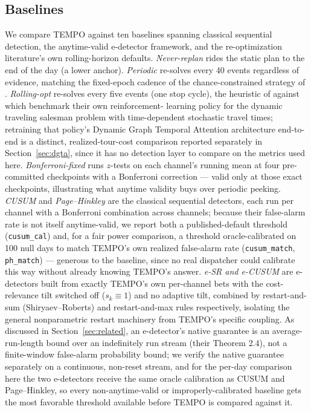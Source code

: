 \documentclass[trsc,dblanonrev]{informs4}
\begin{document}
\subsection{Baselines}\label{sec:baselines}

We compare TEMPO against ten baselines spanning classical sequential
detection, the anytime-valid e-detector framework, and the
re-optimization literature's own rolling-horizon defaults.
\emph{Never-replan} rides the static plan to the end of the day (a
lower anchor). \emph{Periodic} re-solves every 40 events regardless of
evidence, matching the fixed-epoch cadence of the chance-constrained
strategy of \citet{he2026smpc}. \emph{Rolling-opt} re-solves every five
events (one stop cycle), the heuristic of \citet{gmira2021rollingopt}
against which \citet{chen2025dgta} benchmark their own reinforcement-
learning policy for the dynamic traveling salesman problem with
time-dependent stochastic travel times; retraining that policy's
Dynamic Graph Temporal Attention architecture end-to-end is a distinct,
realized-tour-cost comparison reported separately in
Section~\ref{sec:dgta}, since it has no detection layer to compare on
the metrics used here. \emph{Bonferroni-fixed} runs $z$-tests on each
channel's running mean at four pre-committed checkpoints with a
Bonferroni correction --- valid only at those exact checkpoints,
illustrating what anytime validity buys over periodic peeking.
\emph{CUSUM} \citep{page1954} and \emph{Page--Hinkley}
\citep{gama2014survey} are the classical sequential detectors, each run
per channel with a Bonferroni combination across channels; because
their false-alarm rate is not itself anytime-valid, we report both a
published-default threshold (\texttt{cusum\_cal}) and, for a fair
power comparison, a threshold oracle-calibrated on 100 null days to
match TEMPO's own realized false-alarm rate (\texttt{cusum\_match},
\texttt{ph\_match}) --- generous to the baseline, since no real
dispatcher could calibrate this way without already knowing TEMPO's
answer. \emph{e-SR and e-CUSUM} \citep{shin2024edetectors} are
e-detectors built from exactly TEMPO's own per-channel bets with the
cost-relevance tilt switched off ($s_k \equiv 1$) and no adaptive
tilt, combined by restart-and-sum (Shiryaev--Roberts) and
restart-and-max rules respectively, isolating the general
nonparametric restart machinery from TEMPO's specific coupling. As
discussed in Section~\ref{sec:related}, an e-detector's native
guarantee is an average-run-length bound over an indefinitely run
stream (their Theorem 2.4), not a finite-window false-alarm
probability bound; we verify the native guarantee separately on a
continuous, non-reset stream, and for the per-day comparison here the
two e-detectors receive the same oracle calibration as CUSUM and
Page--Hinkley, so every non-anytime-valid or improperly-calibrated
baseline gets the most favorable threshold available before TEMPO is
compared against it.
\end{document}
